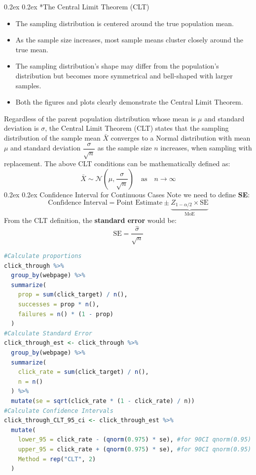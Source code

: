 \documentclass[8pt,landscape]{article}
\makeatletter
\renewcommand{\subsection}{\@startsection{subsection}{2}{0pt}%
    {0.2ex}%
    {0.2ex}%
    {\fontsize{8}{8}\bfseries\color{blue}}} %
\newcommand{\smalltext}[1]{%
  {\fontsize{8}{7}\selectfont\sloppy #1\par}%
}
\makeatother
\begin{document}
\pagestyle{empty}
\begin{multicols}{3}
\subsection*{The Central Limit Theorem (CLT)}
\smalltext{
\begin{itemize}
    \item The sampling distribution is centered around the true population mean.
    \item As the sample size increases, most sample means cluster closely around the true mean.
    \item The sampling distribution’s shape may differ from the population’s distribution but becomes more symmetrical and bell-shaped with larger samples.
    \item Both the figures and plots clearly demonstrate the Central Limit Theorem.
\end{itemize}
Regardless of the parent population distribution whose mean is $\mu$ and standard deviation is $\sigma$, 
the Central Limit Theorem (CLT) states that the sampling distribution of the sample mean $\bar{X}$ 
converges to a Normal distribution with mean $\mu$ and standard deviation $\dfrac{\sigma}{\sqrt{n}}$ 
as the sample size $n$ increases, when sampling with replacement.
The above CLT conditions can be mathematically defined as:
\[
\bar{X} \sim \mathcal{N}\left(\mu, \frac{\sigma}{\sqrt{n}}\right)
\quad \text{as} \quad n \to \infty
\]
\subsection{Confidence Interval for Continuous Cases}
Note we need to define \textbf{SE}:
\[
\text{Confidence Interval} = \text{Point Estimate} \pm 
\underbrace{Z_{1-\alpha/2} \times \text{SE}}_{\text{MoE}}
\]
From the CLT definition, the \textbf{standard error} would be:
\[
\text{SE} = \frac{\hat{\sigma}}{\sqrt{n}}
\]
}
\begin{lstlisting}[language=R]
#Calculate proportions
click_through %>%
  group_by(webpage) %>%
  summarize(
    prop = sum(click_target) / n(),
    successes = prop * n(),
    failures = n() * (1 - prop)
  )
#Calculate Standard Error
click_through_est <- click_through %>%
  group_by(webpage) %>%
  summarize(
    click_rate = sum(click_target) / n(),
    n = n()
  ) %>%
  mutate(se = sqrt(click_rate * (1 - click_rate) / n))
#Calculate Confidence Intervals
click_through_CLT_95_ci <- click_through_est %>%
  mutate(
    lower_95 = click_rate - (qnorm(0.975) * se), #for 90CI qnorm(0.95)
    upper_95 = click_rate + (qnorm(0.975) * se), #for 90CI qnorm(0.95)
    Method = rep("CLT", 2)
  )
\end{lstlisting}

\end{multicols}
\end{document}
